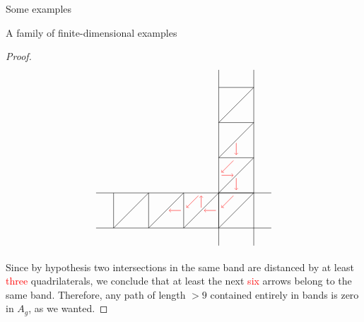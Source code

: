 \begin{chapter}{Some examples}
\begin{section}{A family of finite-dimensional examples}
\begin{proof}
\[
\begin{tikzpicture}
\draw (-3.5*1.25, 0) -- (1.5*1.25, 0);
\draw (-3.5*1.25, -1.25) -- (1.5*1.25, -1.25);
\draw (0,3.5*1.25) -- (0,-1.5*1.25);
\draw (1.25,3.5*1.25) -- (1.25,-1.5*1.25);

\foreach \x in {-3.75,-2.5,...,0}
{
\draw (\x,-1.25) -- (\x+1.25, 0);
\draw (0, -\x) -- (1.25, -\x);
\draw (\x,0) -- (\x, -1.25);
}

\foreach \x in {0,1.25,...,2.5}
\draw (0, \x) -- (1.25, \x+1.25);

\draw[->, red] (0.5*1.25, 1.5*1.25 - 0.1) -- (0.5*1.25, 1.25 + 0.1);
\draw[->, red] (0.5*1.25 - 0.1, 1.25-0.1) -- (0.1, 0.5*1.25+0.1);
\draw[->, red] (0.1, 0.5*1.25) -- (0.5*1.25 - 0.1, 0.5*1.25);
\draw[->, red] (0.5*1.25, 0.5*1.25-0.1) -- (0.5*1.25, 0.1);
\draw[->, red] (0.5*1.25 - 0.1, -0.1) -- (0.1, -0.5*1.25+0.1);
\draw[->, red] (-0.1, -0.5*1.25) -- (-0.5*1.25+0.1, -0.5*1.25);
\draw[->, red] (-0.5*1.25, -0.5*1.25+0.1) -- (-0.5*1.25, -0.1);
\draw[->, red] (-0.5*1.25 - 0.1, -0.1) -- (-1.25 + 0.1, -0.5*1.25+0.1);
\draw[->, red] (-1.25 -0.1, -0.5*1.25) -- (-1.5*1.25+0.1, -0.5*1.25);
\end{tikzpicture}
\]

Since by hypothesis two intersections in the same band are distanced by at least \textcolor{red}{three} quadrilaterals, we conclude that at least the next \textcolor{red}{six} arrows belong to the same band. Therefore, any path of length $>9$ contained entirely in bands is zero in $A_g$, as we wanted.



\end{proof}
\end{section}
\end{chapter}